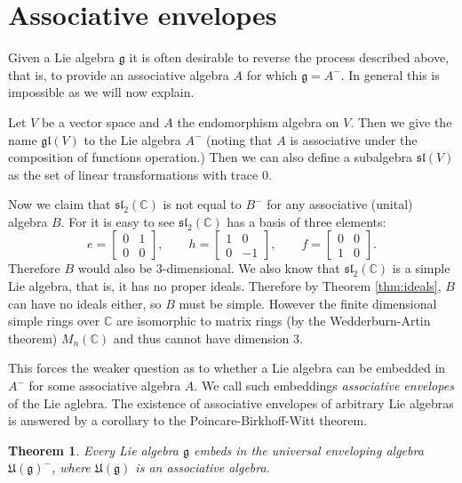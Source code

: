 \documentclass[12pt]{article}
\newtheorem{thm}{Theorem}
\begin{document}
\section{Associative envelopes}

Given a Lie algebra $\mathfrak{g}$ it is often desirable to reverse the process
described above, that is, to provide an associative algebra $A$ for which
$\mathfrak{g}=A^-$.  In general this is impossible as we will now explain.

Let $V$ be a vector space and $A$ the endomorphism algebra on $V$.  Then we
give the name $\mathfrak{gl}(V)$ to the Lie algebra $A^-$ (noting that $A$ is
associative under the composition of functions operation.)  Then we can also
define a subalgebra $\mathfrak{sl}(V)$ as the set of linear transformations
with trace 0.

Now we claim that $\mathfrak{sl}_2(\mathbb{C})$ is not equal to $B^-$ for any associative (unital) algebra $B$.  For it is easy to see $\mathfrak{sl}_2(\mathbb{C})$ has a basis of
three elements:
\[e=\begin{bmatrix} 0 & 1\\ 0 & 0\end{bmatrix},\qquad
h=\begin{bmatrix} 1 & 0 \\ 0 & -1\end{bmatrix},\qquad
f=\begin{bmatrix} 0 & 0 \\ 1 & 0\end{bmatrix}.\]
Therefore $B$ would also be 3-dimensional.  We also know that $\mathfrak{sl}_2(\mathbb{C})$ is a simple Lie algebra, that is, it has no 
proper ideals.  Therefore by Theorem \ref{thm:ideals}, $B$ can have no 
ideals either, so $B$ must be simple.  However the finite dimensional 
simple rings over $\mathbb{C}$ are isomorphic to matrix rings (by the Wedderburn-Artin theorem) 
$M_n(\mathbb{C})$ and thus cannot have dimension 3.

This forces the weaker question as to whether a Lie algebra can be embedded
in $A^-$ for some associative algebra $A$.  We call such embeddings \emph{
associative envelopes} of the Lie aglebra.  The existence of associative
envelopes of arbitrary Lie algebras is answered by a corollary
to the Poincare-Birkhoff-Witt theorem.

\begin{thm}
Every Lie algebra $\mathfrak{g}$ embeds in the universal enveloping algebra $\mathfrak{U(g)}^-$, where $\mathfrak{U(g)}$ is an associative algebra.
\end{thm}
\end{document}
